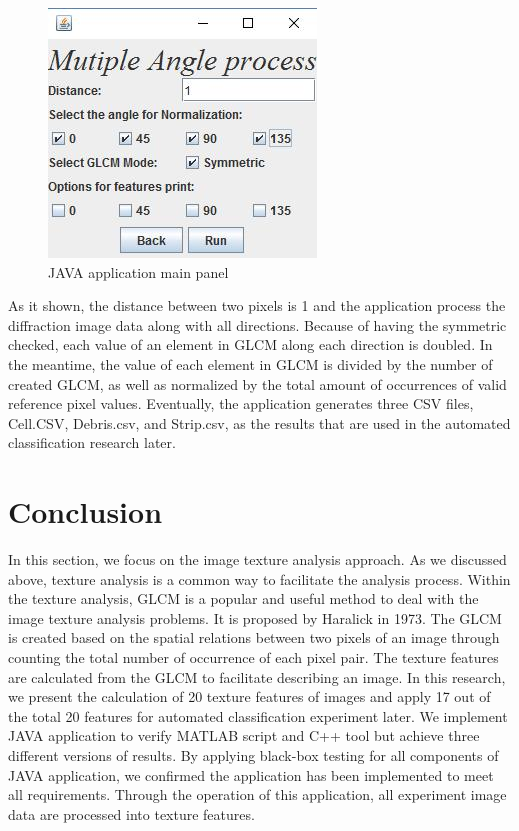 \begin{figure}
\centering
\includegraphics{java_panel}
\caption{JAVA application main panel}
\end{figure}
As it shown, the distance between two pixels is 1 and the application process the diffraction image data along with all directions. Because of having the symmetric checked, each value of an element in GLCM along each direction is doubled. In the meantime, the value of each element in GLCM is divided by the number of created GLCM, as well as normalized by the total amount of occurrences of valid reference pixel values. Eventually, the application generates three CSV files, Cell.CSV, Debris.csv, and Strip.csv, as the results that are used in the automated classification research later. 
\section{Conclusion}
In this section, we focus on the image texture analysis approach. As we discussed above, texture analysis is a common way to facilitate the analysis process. Within the texture analysis, GLCM is a popular and useful method to deal with the image texture analysis problems. It is proposed by Haralick\cite{Haralick} in 1973. The GLCM is created based on the spatial relations between two pixels of an image through counting the total number of occurrence of each pixel pair. The texture features are calculated from the GLCM to facilitate describing an image. In this research, we present the calculation of 20 texture features of images and apply 17 out of the total 20 features for automated classification experiment later. We implement JAVA application to verify MATLAB script and C++ tool but achieve three different versions of results. By applying black-box testing for all components of JAVA application, we confirmed the application has been implemented to meet all requirements. Through the operation of this application, all experiment image data are processed into texture features.  